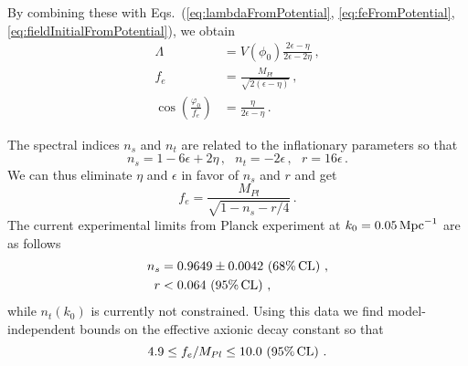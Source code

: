 \documentclass[12pt]{article}
\begin{document}
By combining these with Eqs.~(\ref{eq:lambdaFromPotential}, \ref{eq:feFromPotential}, \ref{eq:fieldInitialFromPotential}), we obtain
\begin{align} %
  \label{eq:lambdaSlowRoll}
  \Lambda &= V\left(\phi_0\right) \frac{2 \epsilon - \eta}{2 \epsilon - 2 \eta}\,,\\
  \label{eq:feSlowRoll}
  f_e &= \frac{M_{Pl}}{\sqrt{2 \left(\epsilon - \eta\right)}}\,,\\
  \label{eq:fieldInitialSlowRoll}
  \cos\left(\frac{\varphi_0}{f_e}\right) &= \frac{\eta}{2 \epsilon - \eta}\,.
\end{align}

The spectral indices $n_s$ and $n_t$ are related to the inflationary parameters so that
\begin{equation} \label{eq:observablesSlowRoll}
  n_s = 1 - 6 \epsilon + 2 \eta\,,
  ~~~ n_t = -2 \epsilon\,,
  ~~~ r = 16 \epsilon\,.
\end{equation}
We can thus eliminate $\eta$ and $\epsilon$ in favor of $n_s$ and $r$ and get
\begin{equation} \label{eq:feSpectralIndices}
  f_e = \frac{M_{Pl}}{\sqrt{1 - n_s - r / 4}}\,.
\end{equation}
The current experimental limits from Planck experiment at $k_0 = 0.05\,{\rm Mpc}^{-1}$ are as follows~\cite{Akrami:2018vks, Akrami:2018odb, Array:2015xqh}
\begin{equation} \label{data}
  \begin{aligned}
    n_s &= 0.9649 \pm 0.0042\, \left(68\%\, {\rm CL}\right)\,,\\
      r &< 0.064\, \left(95\%\, {\rm CL}\right)\,,
  \end{aligned}
\end{equation}
while $n_t\left(k_0\right)$ is currently not constrained.
Using this data we find model-independent bounds on the effective axionic decay constant so that
\begin{equation} \label{eq:feExperimentalConstraint}
  4.9 \leq f_e / M_{Pl} \leq 10.0\, \left(95\%\, {\rm CL}\right)\,.
\end{equation}
\end{document}
